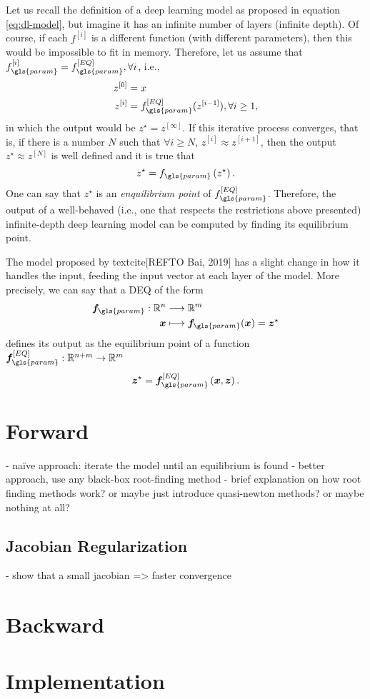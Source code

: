 Let us recall the definition of a deep learning model as proposed in equation \eqref{eq:dl-model}, but imagine it has an infinite number of layers (infinite depth).
Of course, if each $f^{[i]}$ is a different function (with different parameters), then this would be impossible to fit in memory.
Therefore, let us assume that $f_{\gls{param}}^{[i]}=f_{\gls{param}}^{[EQ]},\forall i$, i.e.,
\begin{equation*}
\begin{split}
    z^{[0]} &= x \\
    z^{[i]} &= f_{\gls{param}}^{[EQ]}(z^{[i-1]}), \forall i\ge 1
,\end{split}
\end{equation*}
in which the output would be $z^{\star} = z^{[\infty]}$.
If this iterative process converges, that is, if there is a number $N$ such that $\forall i\ge N,\,z^{[i]}\approx z^{[i+1]}$, then the output $z^{\star}\approx z^{[N]}$ is well defined and it is true that  \[
    z^{\star} = f_{\gls{param}}\left( z^{\star} \right) 
.\] 
One can say that $z^{\star}$ is an \emph{enquilibrium point} of $f_{\gls{param}}^{[EQ]}$.
Therefore, the output of a well-behaved (i.e., one that respects the restrictions above presented) infinite-depth deep learning model can be computed by finding its equilibrium point.

The model proposed by textcite[REFTO Bai, 2019] has a slight change in how it handles the input, feeding the input vector at each layer of the model. More precisely, we can say that a \gls{DEQ} of the form
\begin{align*}
    \bm{f}_{\gls{param}}: \R^{n} &\longrightarrow \R^{m} \\
    \bm{x} &\longmapsto \bm{f}_{\gls{param}}(\bm{x}) = \bm{z}^{\star}
\end{align*}
defines its output as the equilibrium point of a function $\bm{f}_{\gls{param}}^{[EQ]}:\R^{n+m}\to \R^{m}$
\begin{equation}\label{eq:z-star}
    \bm{z}^{\star} = \bm{f}_{\gls{param}}^{[EQ]}\left( \bm{x},\bm{z} \right) 
.\end{equation}

\section{Forward}

- naïve approach: iterate the model until an equilibrium is found
- better approach, use any black-box root-finding method
- brief explanation on how root finding methods work? or maybe just introduce quasi-newton methods? or maybe nothing at all?

\subsection{Jacobian Regularization}

- show that a small jacobian => faster convergence

\section{Backward}

\section{Implementation}


